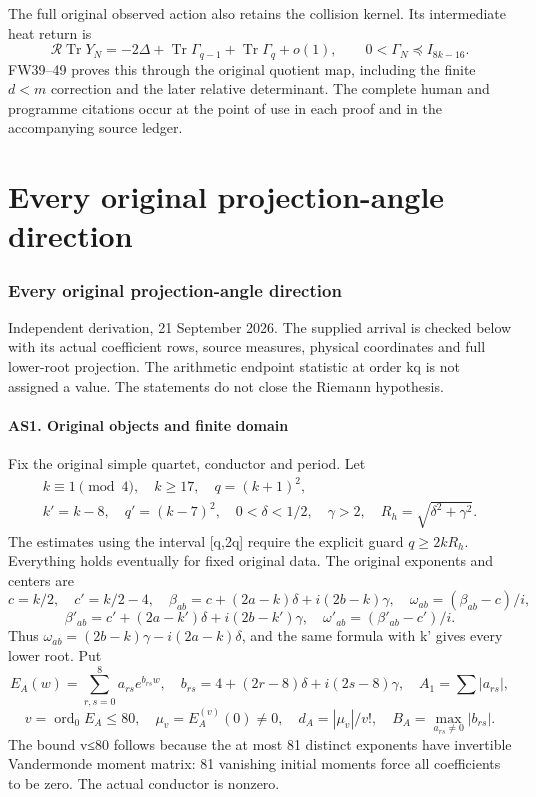 \documentclass[11pt]{article}
\begin{document}
The full original observed action also retains the collision kernel.
Its intermediate heat return is
\[
\mathcal R\operatorname{Tr}Y_N=-2\Delta+
\operatorname{Tr}\Gamma_{q-1}+\operatorname{Tr}\Gamma_q+o(1),
\qquad0<\Gamma_N\preceq I_{8k-16}.
\]
FW39--49 proves this through the original quotient map, including
the finite $d<m$ correction and the later relative determinant.
The complete human and programme citations occur at the point of
use in each proof and in the accompanying source ledger.
\clearpage

\clearpage\part{Every original projection-angle direction}
\section{Every original projection-angle direction}\label{every-original-projection-angle-direction}

Independent derivation, 21 September 2026. The supplied arrival is checked below with its actual coefficient rows, source measures, physical coordinates and full lower-root projection. The arithmetic endpoint statistic at order kq is not assigned a value. The statements do not close the Riemann hypothesis.

\subsection{AS1. Original objects and finite domain}\label{as1.-original-objects-and-finite-domain}

Fix the original simple quartet, conductor and period. Let \[
\begin{gathered}k\equiv1\pmod4,\quad k\ge17,\quad q=(k+1)^2,\\
k'=k-8,\quad q'=(k-7)^2,\quad 0<\delta<1/2,\quad\gamma>2,
\quad R_h=\sqrt{\delta^2+\gamma^2}.\end{gathered}
\] The estimates using the interval {[}q,2q{]} require the explicit guard \(q\ge2kR_h\). Everything holds eventually for fixed original data. The original exponents and centers are \[
c=k/2,\quad c'=k/2-4,\quad
\beta_{ab}=c+(2a-k)\delta+i(2b-k)\gamma,
\quad\omega_{ab}=(\beta_{ab}-c)/i,
\] \[
\beta'_{ab}=c'+(2a-k')\delta+i(2b-k')\gamma,
\quad\omega'_{ab}=(\beta'_{ab}-c')/i.
\] Thus \(\omega_{ab}=(2b-k)\gamma-i(2a-k)\delta\), and the same formula with k' gives every lower root. Put \[
E_A(w)=\sum_{r,s=0}^8a_{rs}e^{b_{rs}w},\quad
b_{rs}=4+(2r-8)\delta+i(2s-8)\gamma,
\quad A_1=\sum|a_{rs}|,
\] \[
v=\operatorname{ord}_0E_A\le80,\quad
\mu_v=E_A^{(v)}(0)\ne0,\quad d_A=|\mu_v|/v!,\quad
B_A=\max_{a_{rs}\ne0}|b_{rs}|.
\] The bound v≤80 follows because the at most 81 distinct exponents have invertible Vandermonde moment matrix: 81 vanishing initial moments force all coefficients to be zero. The actual conductor is nonzero.
\end{document}
